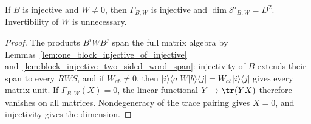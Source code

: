 \begin{lemma}
    \label{thm:mpo_inserted_boundary_injective}
    \leanok
    If $B$ is injective and $W\neq0$, then $\Gamma_{B,W}$ is injective
    and $\dim\mathcal S'_{B,W}=D^2$. Invertibility of $W$ is unnecessary.
\end{lemma}
\begin{proof}
    \leanok
    The products $B^iWB^j$ span the full matrix algebra by
    Lemmas~\ref{lem:one_block_injective_of_injective}
    and~\ref{lem:block_injective_two_sided_word_span}:
    injectivity of $B$ extends their span to every $RWS$, and if $W_{ab}\neq0$,
    then $|i\rangle\langle a|W|b\rangle\langle j|
        =W_{ab}|i\rangle\langle j|$ gives every matrix unit.
    If $\Gamma_{B,W}(X)=0$, the linear functional $Y\mapsto\tr(YX)$
    therefore vanishes on all matrices. Nondegeneracy of the trace pairing
    gives $X=0$, and injectivity gives the dimension.
\end{proof}

